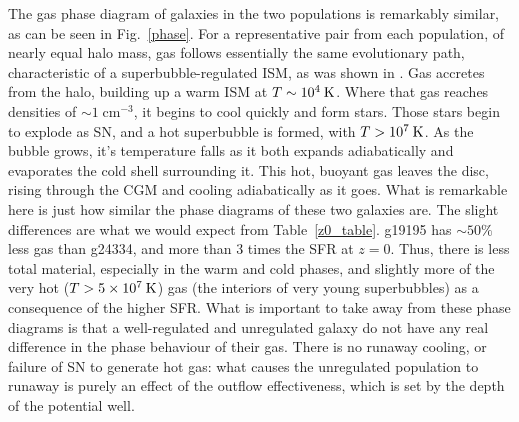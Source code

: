 The gas phase diagram of galaxies in the two populations is remarkably similar,
as can be seen in Fig.~\ref{phase}.  For a representative pair from each
population, of nearly equal halo mass, gas follows essentially the same
evolutionary path, characteristic of a superbubble-regulated ISM, as was shown in
\citet{Keller2015}.  Gas accretes from the halo,
building up a warm ISM at $T\sim10^4\>{\rm K}$.  Where that gas reaches densities of
$\sim 1\;$cm$^{-3}$, it begins to cool quickly and form stars.  Those stars begin to
explode as SN, and a hot superbubble is formed, with $T>10^7\>{\rm K}$.  As the bubble
grows, it's temperature falls as it both expands adiabatically and evaporates
the cold shell surrounding it.  This hot, buoyant gas leaves the disc, rising
through the CGM and cooling adiabatically as it goes.  What is remarkable here
is just how similar the phase diagrams of these two galaxies are.  The slight
differences are what we would expect from Table~\ref{z0_table}.  g19195 has
$\sim50\%$ less gas than g24334, and more than 3 times the SFR at $z=0$.  Thus,
there is less total material, especially in the warm and cold phases, and
slightly more of the very hot ($T>5\times10^7\>{\rm K}$) gas (the interiors of very young
superbubbles) as a consequence of the higher SFR.  What is important to take
away from these phase diagrams is that a well-regulated and unregulated galaxy
do not have any real difference in the phase behaviour of their gas.  There is
no runaway cooling, or failure of SN to generate hot gas:  what causes the
unregulated population to runaway is purely an effect of the outflow
effectiveness, which is set by the depth of the potential well.

